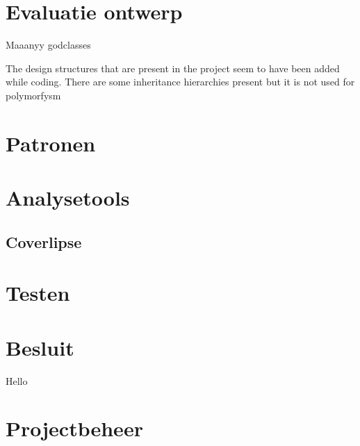 \documentclass[pdftex12pt, a4paper]{article}
\begin{document}
\newpage

\section{Evaluatie ontwerp}

Maaanyy godclasses

The design structures that are present in the project seem to have been added while coding. 
There are some inheritance hierarchies present but it is not used for polymorfysm 

\section{Patronen}

\newpage

\section{Analysetools}

\subsection{Coverlipse}

\newpage

\section{Testen}

\newpage

\section{Besluit}

Hello 


\newpage

\section{Projectbeheer}
\end{document}
